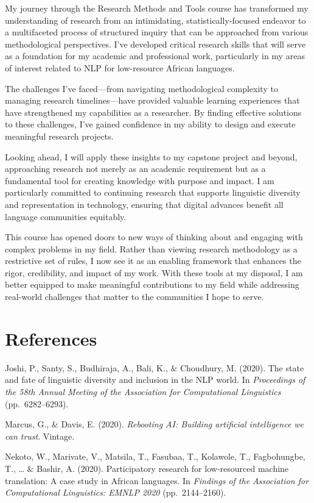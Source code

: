 \documentclass[
]{article}
\begin{document}
My journey through the Research Methods and Tools course has transformed
my understanding of research from an intimidating, statistically-focused
endeavor to a multifaceted process of structured inquiry that can be
approached from various methodological perspectives. I've developed
critical research skills that will serve as a foundation for my academic
and professional work, particularly in my areas of interest related to
NLP for low-resource African languages.

The challenges I've faced---from navigating methodological complexity to
managing research timelines---have provided valuable learning
experiences that have strengthened my capabilities as a researcher. By
finding effective solutions to these challenges, I've gained confidence
in my ability to design and execute meaningful research projects.

Looking ahead, I will apply these insights to my capstone project and
beyond, approaching research not merely as an academic requirement but
as a fundamental tool for creating knowledge with purpose and impact. I
am particularly committed to continuing research that supports
linguistic diversity and representation in technology, ensuring that
digital advances benefit all language communities equitably.

This course has opened doors to new ways of thinking about and engaging
with complex problems in my field. Rather than viewing research
methodology as a restrictive set of rules, I now see it as an enabling
framework that enhances the rigor, credibility, and impact of my work.
With these tools at my disposal, I am better equipped to make meaningful
contributions to my field while addressing real-world challenges that
matter to the communities I hope to serve.

\newpage

\section*{References}\label{references}

Joshi, P., Santy, S., Budhiraja, A., Bali, K., \& Choudhury, M. (2020).
The state and fate of linguistic diversity and inclusion in the NLP
world. In \emph{Proceedings of the 58th Annual Meeting of the
Association for Computational Linguistics} (pp.~6282--6293).

Marcus, G., \& Davis, E. (2020). \emph{Rebooting AI: Building artificial
intelligence we can trust}. Vintage.

Nekoto, W., Marivate, V., Matsila, T., Fasubaa, T., Kolawole, T.,
Fagbohungbe, T., \ldots{} \& Bashir, A. (2020). Participatory research
for low-resourced machine translation: A case study in African
languages. In \emph{Findings of the Association for Computational
Linguistics: EMNLP 2020} (pp.~2144--2160).
\end{document}
